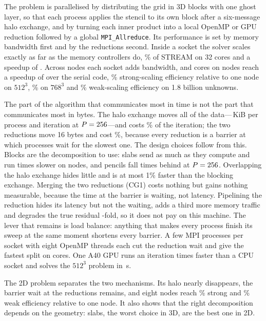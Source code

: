\documentclass[10pt,a4paper]{article}
\newcommand{\code}[1]{\texttt{#1}}
\begin{document}
The problem is parallelised by distributing the grid in 3D blocks with one ghost layer, so that each
process applies the stencil to its own block after a six-message halo exchange, and by turning each inner
product into a local OpenMP or GPU reduction followed by a global \code{MPI\_Allreduce}. Its performance is
set by memory bandwidth first and by the reductions second. Inside a socket the solver scales exactly as
far as the memory controllers do, \CGbwFrac\% of STREAM on 32 cores and a speedup of \SpeedupNode. Across
nodes each socket adds bandwidth, and \Pmax{} cores on \NodesMax{} nodes reach a speedup of \SpeedupPmax{}
over the serial code, \NodeEffPmax\% strong-scaling efficiency relative to one node on $512^3$,
\NodeEffTwoPmax\% on $768^3$ and \WeakNodeEff\% weak-scaling efficiency on 1.8 billion unknowns.

The part of the algorithm that communicates most in time is not the part that communicates most in bytes.
The halo exchange moves all of the data---\HaloKiBPmax\,KiB per process and iteration at $P=256$---and
costs \HaloFracPmax\% of the iteration; the two reductions move 16 bytes and cost \RedFracPmax\%, because
every reduction is a barrier at which \Pmax{} processes wait for the slowest one. The design choices follow
from this. Blocks are the decomposition to use: slabs send as much as they compute and run \RelOneD{}
times slower on \NodesMax{} nodes, and pencils fall \RelTwoD{} times behind at $P=256$. Overlapping the halo exchange hides little and is at most 1\% faster than the
blocking exchange. Merging the two reductions (CG1) costs nothing but gains nothing measurable, because the
time at the barrier is waiting, not latency. Pipelining the reduction hides its latency but not the
waiting, adds a third more memory traffic and degrades the true residual \SolvePipeRatio-fold, so it does
not pay on this machine. The lever that remains is load balance: anything that makes every process finish
its sweep at the same moment shortens every barrier. A few MPI processes per socket with eight OpenMP
threads each cut the reduction wait and give the fastest split on \HybCores{} cores. One A40 GPU runs an
iteration \GpuVsSocket{} times faster than a CPU socket and solves the $512^3$ problem in \SolveGpu\,s.

The 2D problem separates the two mechanisms. Its halo nearly disappears, the barrier wait at the
reductions remains, and eight nodes reach \TwoNodeEffMax\% strong and \TwoWeakNodeEff\% weak efficiency
relative to one node. It also shows that the right decomposition depends on the geometry: slabs, the
worst choice in 3D, are the best one in 2D.
\end{document}
